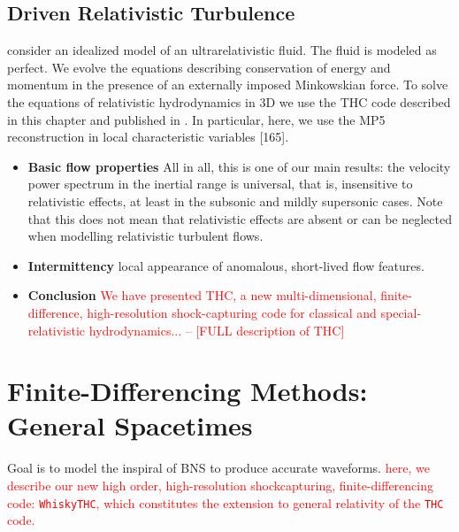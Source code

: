 \documentclass[11pt,a4paper,headinclude=true,DIV=14,BCOR=8mm,chapterprefix,listof=totoc,twoside,openright,abstracton]{scrbook}
\begin{document}
\subsection{Driven Relativistic Turbulence}

consider an idealized model of an ultrarelativistic fluid. The fluid is modeled as perfect. We evolve the equations describing conservation of energy and momentum in the presence of an externally imposed Minkowskian force. To solve the equations of relativistic hydrodynamics in 3D we use the THC
code described in this chapter and published in \cite{Radice:2012cu}. In particular, here, we use the MP5 reconstruction in local characteristic variables [165].
\begin{itemize}
    \item \textbf{Basic flow properties} All in all, this is one of our main results: the velocity power spectrum in the inertial range is universal, that is, insensitive to relativistic effects, at least in the subsonic and mildly supersonic cases. Note that this does not mean that
    relativistic effects are absent or can be neglected when modelling relativistic turbulent flows.
    \item \textbf{Intermittency} local appearance of anomalous, short-lived flow features.
    \item \textbf{Conclusion} \textcolor{red}{We have presented THC, a new multi-dimensional, finite-difference, high-resolution shock-capturing code for classical and special-relativistic hydrodynamics... -- [FULL description of THC]}
\end{itemize}

\section{Finite-Differencing Methods: General Spacetimes} 

Goal is to model the inspiral of BNS to produce accurate waveforms. \textcolor{red}{here, we describe our new high order, high-resolution shockcapturing, finite-differencing code: \texttt{WhiskyTHC}, which constitutes the extension to general relativity of the \texttt{THC} code.}
\end{document}
